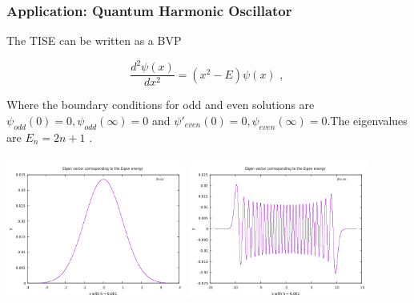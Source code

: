 \documentclass{beamer}
\begin{document}
\begin{frame}
	\frametitle{Application: Quantum Harmonic Oscillator}
	
	The TISE  can be written as a BVP 
	
	\begin{equation}
	\frac{d^2 \psi(x)}{d x^2} = ( x^2 - E ) \psi(x) \text{     ,    } 
	\end{equation}
	
	Where the boundary conditions for odd and even solutions are $ \psi_{odd}(0)=0, \psi_{odd}(\infty) = 0$ and $ \psi'_{even}(0) = 0, \psi_{even}(\infty) = 0$.The eigenvalues are $ E_n  = 2n+1 $ .

	\begin{center}
	\includegraphics[width = 5.9cm , height = 4.8cm ]{7.png}
	\includegraphics[width = 5.9cm , height = 4.8cm ]{9.png}
    \end{center}	
	
\end{frame}
\end{document}
